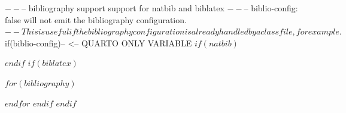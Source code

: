 $--
$-- bibliography support support for natbib and biblatex
$--

$-- biblio-config: false will not emit the bibliography configuration.
$-- This is useful if the bibliography configuration is already handled by a class file, for example.
$if(biblio-config)$ $-- <-- QUARTO ONLY VARIABLE
$if(natbib)$
\usepackage[$natbiboptions$]{natbib}

$endif$
$if(biblatex)$
\usepackage[$if(biblio-style)$style=$biblio-style$,$endif$$for(biblatexoptions)$$biblatexoptions$$sep$,$endfor$]{biblatex-chicago}
$for(bibliography)$

$endfor$
$endif$
$endif$
